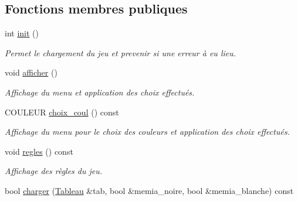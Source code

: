\subsection*{Fonctions membres publiques}
\begin{DoxyCompactItemize}
\item 
int \hyperlink{classMenu_a514c26765dc9e00098f199c6c98788a4}{init} ()\hypertarget{classMenu_a514c26765dc9e00098f199c6c98788a4}{}\label{classMenu_a514c26765dc9e00098f199c6c98788a4}

\begin{DoxyCompactList}\small\item\em Permet le chargement du jeu et prevenir si une erreur à eu lieu. \end{DoxyCompactList}\item 
void \hyperlink{classMenu_afc925fd19c50c3c724924f32673fbaf8}{afficher} ()\hypertarget{classMenu_afc925fd19c50c3c724924f32673fbaf8}{}\label{classMenu_afc925fd19c50c3c724924f32673fbaf8}

\begin{DoxyCompactList}\small\item\em Affichage du menu et application des choix effectués. \end{DoxyCompactList}\item 
C\+O\+U\+L\+E\+UR \hyperlink{classMenu_a8985cbb2c3618edc7c4c42eb94ef9513}{choix\+\_\+coul} () const \hypertarget{classMenu_a8985cbb2c3618edc7c4c42eb94ef9513}{}\label{classMenu_a8985cbb2c3618edc7c4c42eb94ef9513}

\begin{DoxyCompactList}\small\item\em Affichage du menu pour le choix des couleurs et application des choix effectués. \end{DoxyCompactList}\item 
void \hyperlink{classMenu_abca65b44c7a2f424a00c4381f853dee0}{regles} () const \hypertarget{classMenu_abca65b44c7a2f424a00c4381f853dee0}{}\label{classMenu_abca65b44c7a2f424a00c4381f853dee0}

\begin{DoxyCompactList}\small\item\em Affichage des règles du jeu. \end{DoxyCompactList}\item 
bool \hyperlink{classMenu_a4d938d0f79289ad48576d7a99db0461d}{charger} (\hyperlink{classTableau}{Tableau} \&tab, bool \&memia\+\_\+noire, bool \&memia\+\_\+blanche) const \hypertarget{classMenu_a4d938d0f79289ad48576d7a99db0461d}{}\label{classMenu_a4d938d0f79289ad48576d7a99db0461d}


\end{DoxyCompactItemize}

